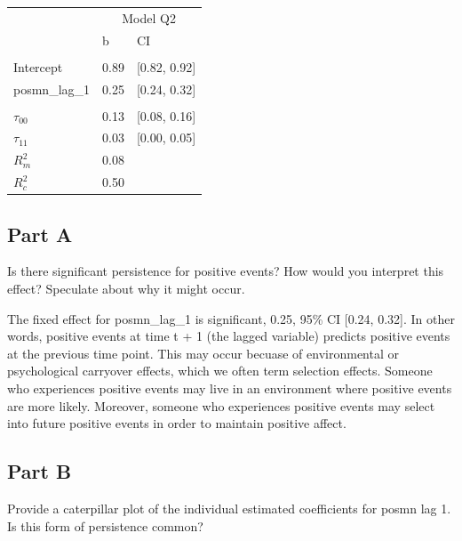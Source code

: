 \documentclass[]{article}
\begin{document}
\begin{table}[H]
\centering
\begin{tabular}{lll}
\toprule
\multicolumn{1}{c}{ } & \multicolumn{2}{c}{Model Q2} \\
\cmidrule(l{2pt}r{2pt}){2-3}
 & b & CI\\
\midrule
\addlinespace[0.3em]
\multicolumn{3}{l}{\textbf{Fixed}}\\
\hspace{1em}Intercept & 0.89 & [0.82, 0.92]\\
\hspace{1em}posmn\_lag\_1 & 0.25 & [0.24, 0.32]\\
\addlinespace[0.3em]
\multicolumn{3}{l}{\textbf{Random}}\\
\hspace{1em}$\tau_{00}$ & 0.13 & [0.08, 0.16]\\
\hspace{1em}$\tau_{11}$ & 0.03 & [0.00, 0.05]\\
$R^2_m$ & 0.08 & \\
$R^2_c$ & 0.50 & \\
\bottomrule
\end{tabular}
\end{table}

\subsection{Part A}\label{part-a-1}

Is there significant persistence for positive events? How would you
interpret this effect? Speculate about why it might occur.

The fixed effect for posmn\_lag\_1 is significant, 0.25, 95\% CI
{[}0.24, 0.32{]}. In other words, positive events at time t + 1 (the
lagged variable) predicts positive events at the previous time point.
This may occur becuase of environmental or psychological carryover
effects, which we often term selection effects. Someone who experiences
positive events may live in an environment where positive events are
more likely. Moreover, someone who experiences positive events may
select into future positive events in order to maintain positive affect.

\subsection{Part B}\label{part-b-1}

Provide a caterpillar plot of the individual estimated coefficients for
posmn lag 1. Is this form of persistence common?
\end{document}
